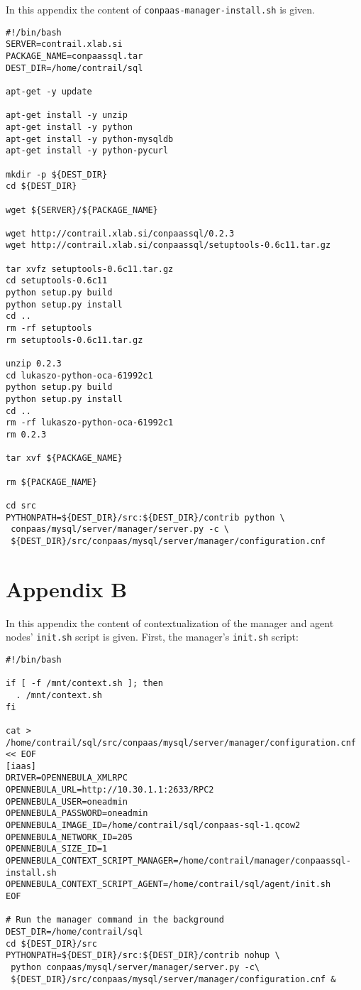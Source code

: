 \documentclass[a4paper,10pt]{article}
\begin{document}
In this appendix the content of {\tt conpaas-manager-install.sh} is given.

\begin{Verbatim}[frame=single]
#!/bin/bash
SERVER=contrail.xlab.si
PACKAGE_NAME=conpaassql.tar
DEST_DIR=/home/contrail/sql

apt-get -y update

apt-get install -y unzip
apt-get install -y python
apt-get install -y python-mysqldb
apt-get install -y python-pycurl

mkdir -p ${DEST_DIR}
cd ${DEST_DIR}

wget ${SERVER}/${PACKAGE_NAME}

wget http://contrail.xlab.si/conpaassql/0.2.3
wget http://contrail.xlab.si/conpaassql/setuptools-0.6c11.tar.gz

tar xvfz setuptools-0.6c11.tar.gz
cd setuptools-0.6c11
python setup.py build
python setup.py install
cd ..
rm -rf setuptools
rm setuptools-0.6c11.tar.gz

unzip 0.2.3
cd lukaszo-python-oca-61992c1
python setup.py build
python setup.py install
cd ..
rm -rf lukaszo-python-oca-61992c1
rm 0.2.3

tar xvf ${PACKAGE_NAME}

rm ${PACKAGE_NAME}

cd src
PYTHONPATH=${DEST_DIR}/src:${DEST_DIR}/contrib python \
 conpaas/mysql/server/manager/server.py -c \
 ${DEST_DIR}/src/conpaas/mysql/server/manager/configuration.cnf

\end{Verbatim}

\newpage

\section{Appendix B}
\label{app:init}

In this appendix the content of contextualization of the manager and agent nodes' {\tt init.sh} script is given. First, the manager's {\tt init.sh} script:

\begin{Verbatim}[frame=single]
#!/bin/bash
 
if [ -f /mnt/context.sh ]; then
  . /mnt/context.sh
fi
 
cat > /home/contrail/sql/src/conpaas/mysql/server/manager/configuration.cnf << EOF
[iaas]
DRIVER=OPENNEBULA_XMLRPC
OPENNEBULA_URL=http://10.30.1.1:2633/RPC2
OPENNEBULA_USER=oneadmin
OPENNEBULA_PASSWORD=oneadmin
OPENNEBULA_IMAGE_ID=/home/contrail/sql/conpaas-sql-1.qcow2
OPENNEBULA_NETWORK_ID=205
OPENNEBULA_SIZE_ID=1
OPENNEBULA_CONTEXT_SCRIPT_MANAGER=/home/contrail/manager/conpaassql-install.sh
OPENNEBULA_CONTEXT_SCRIPT_AGENT=/home/contrail/sql/agent/init.sh
EOF

# Run the manager command in the background
DEST_DIR=/home/contrail/sql
cd ${DEST_DIR}/src
PYTHONPATH=${DEST_DIR}/src:${DEST_DIR}/contrib nohup \
 python conpaas/mysql/server/manager/server.py -c\
 ${DEST_DIR}/src/conpaas/mysql/server/manager/configuration.cnf &

\end{Verbatim}
\end{document}
